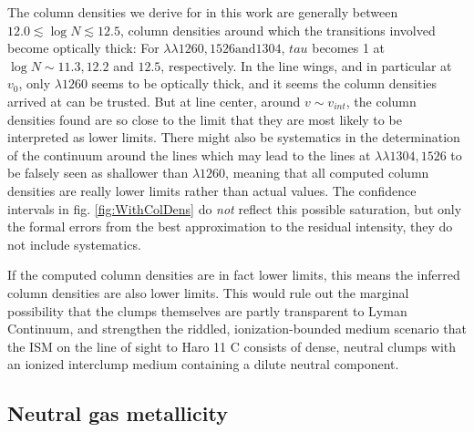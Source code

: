 \documentclass[twocolumn]{aastex61}
\begin{document}
The column densities we derive for  in this work are
generally between $12.0 \lesssim \log N \lesssim 12.5$, column densities
around which the transitions involved become optically thick: For
$\lambda \lambda 1260, 1526 \text{and} 1304$, $tau$ becomes 1 at
$\log N \sim 11.3, 12.2$ and $12.5$, respectively. In the line wings,
and in particular at $v_0$, only $\lambda 1260$ seems to be optically
thick, and it seems the column densities arrived at can be trusted. But
at line center, around $v\sim v_{int}$, the column densities found are
so close to the limit that they are most likely to be interpreted as
lower limits. There might also be systematics in the determination of
the continuum around the lines which may lead to the lines at
$\lambda \lambda 1304, 1526$ to be falsely seen as shallower than
$\lambda 1260$, meaning that all computed column densities are really
lower limits rather than actual values. The confidence intervals in fig.
\ref{fig:WithColDens} do \emph{not} reflect this possible saturation,
but only the formal errors from the best approximation to the residual
intensity, they do not include systematics.

If the computed column densities are in fact lower limits, this means
the inferred  column densities are also lower limits. This
would rule out the marginal possibility that the clumps themselves are
partly transparent to Lyman Continuum, and strengthen the riddled,
ionization-bounded medium scenario that the ISM on the line of sight to
Haro 11 C consists of dense, neutral clumps with an ionized interclump
medium containing a dilute neutral component.

\subsection{Neutral gas metallicity}\label{neutral-gas-metallicity}
\end{document}
